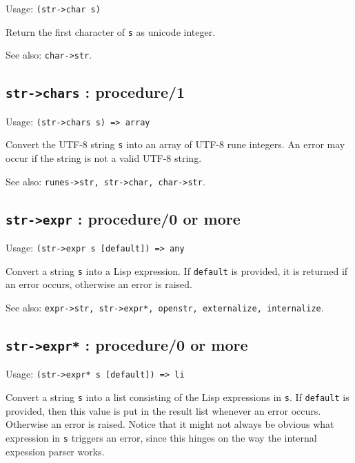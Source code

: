 \documentclass[
]{article}
\newcommand{\passthrough}[1]{#1}
\begin{document}
Usage: \passthrough{\lstinline!(str->char s)!}

Return the first character of \passthrough{\lstinline!s!} as unicode
integer.

See also: \passthrough{\lstinline!char->str!}.

\hypertarget{str-chars-procedure1-1}{%
\subsection{\texorpdfstring{\texttt{str-\textgreater{}chars} :
procedure/1}{str-\textgreater chars : procedure/1}}\label{str-chars-procedure1-1}}

Usage: \passthrough{\lstinline!(str->chars s) => array!}

Convert the UTF-8 string \passthrough{\lstinline!s!} into an array of
UTF-8 rune integers. An error may occur if the string is not a valid
UTF-8 string.

See also: \passthrough{\lstinline!runes->str, str->char, char->str!}.

\hypertarget{str-expr-procedure0-or-more-2}{%
\subsection{\texorpdfstring{\texttt{str-\textgreater{}expr} :
procedure/0 or
more}{str-\textgreater expr : procedure/0 or more}}\label{str-expr-procedure0-or-more-2}}

Usage: \passthrough{\lstinline!(str->expr s [default]) => any!}

Convert a string \passthrough{\lstinline!s!} into a Lisp expression. If
\passthrough{\lstinline!default!} is provided, it is returned if an
error occurs, otherwise an error is raised.

See also:
\passthrough{\lstinline!expr->str, str->expr*, openstr, externalize, internalize!}.

\hypertarget{str-expr-procedure0-or-more-3}{%
\subsection{\texorpdfstring{\texttt{str-\textgreater{}expr*} :
procedure/0 or
more}{str-\textgreater expr* : procedure/0 or more}}\label{str-expr-procedure0-or-more-3}}

Usage: \passthrough{\lstinline!(str->expr* s [default]) => li!}

Convert a string \passthrough{\lstinline!s!} into a list consisting of
the Lisp expressions in \passthrough{\lstinline!s!}. If
\passthrough{\lstinline!default!} is provided, then this value is put in
the result list whenever an error occurs. Otherwise an error is raised.
Notice that it might not always be obvious what expression in
\passthrough{\lstinline!s!} triggers an error, since this hinges on the
way the internal expession parser works.
\end{document}
